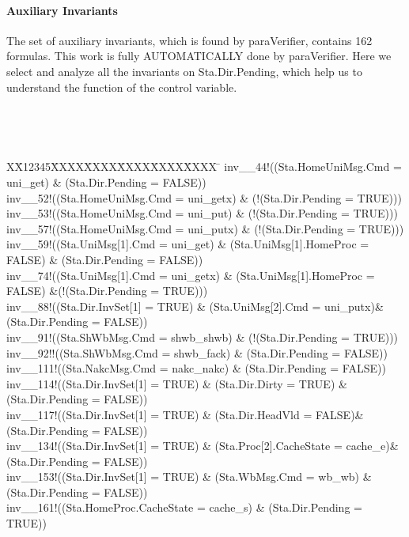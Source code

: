\documentclass{llncs}
\newlength{\fminilength}
\newenvironment{fmini}[1][\linewidth]
  {\setlength{\fminilength}{#1\fboxsep-2\fboxrule}%
   \vspace{2ex}\noindent\begin{lrbox}{\fminibox}\begin{minipage}{\fminilength}%
   \mbox{ }\hfill\vspace{-2.5ex}}%
  {\end{minipage}\end{lrbox}\vspace{1ex}\hspace{0ex}%
   \framebox{\usebox{\fminibox}}}
\newenvironment{specification}
{\noindent\scriptsize
\tt\begin{fmini}\begin{tabbing}X\=X12345\=XXXX\=XXXX\=XXXX\=XXXX\=XXXX
\=\+\kill} {\end{tabbing}\normalfont\end{fmini}}
\begin{document}
\vspace{-10pt}

\paragraph{Auxiliary Invariants }
The set of auxiliary invariants, which is found by {\sf paraVerifier}, contains 162 formulas. This work is  fully AUTOMATICALLY  done by {\sf paraVerifier}.  Here we select and analyze all the invariants on Sta.Dir.Pending, which help us to understand the function of the control variable.

\begin{specification}
inv\_\_44!((Sta.HomeUniMsg.Cmd = uni\_get) \& (Sta.Dir.Pending = FALSE))\\
inv\_\_52!((Sta.HomeUniMsg.Cmd = uni\_getx) \& (!(Sta.Dir.Pending = TRUE)))\\
inv\_\_53!((Sta.HomeUniMsg.Cmd = uni\_put) \& (!(Sta.Dir.Pending = TRUE)))\\
inv\_\_57!((Sta.HomeUniMsg.Cmd = uni\_putx) \& (!(Sta.Dir.Pending = TRUE)))\\
inv\_\_59!((Sta.UniMsg[1].Cmd = uni\_get) \& (Sta.UniMsg[1].HomeProc = FALSE) \& (Sta.Dir.Pending = FALSE))\\
inv\_\_74!((Sta.UniMsg[1].Cmd = uni\_getx) \& (Sta.UniMsg[1].HomeProc = FALSE) \&(!(Sta.Dir.Pending = TRUE)))\\
inv\_\_88!((Sta.Dir.InvSet[1] = TRUE)  \& (Sta.UniMsg[2].Cmd = uni\_putx)\& (Sta.Dir.Pending = FALSE))\\
inv\_\_91!((Sta.ShWbMsg.Cmd = shwb\_shwb) \& (!(Sta.Dir.Pending = TRUE)))\\
inv\_\_92!!((Sta.ShWbMsg.Cmd = shwb\_fack) \& (Sta.Dir.Pending = FALSE))\\
inv\_\_111!((Sta.NakcMsg.Cmd = nakc\_nakc) \& (Sta.Dir.Pending = FALSE))\\
inv\_\_114!((Sta.Dir.InvSet[1] = TRUE) \& (Sta.Dir.Dirty = TRUE) \& (Sta.Dir.Pending = FALSE))\\
inv\_\_117!((Sta.Dir.InvSet[1] = TRUE)  \& (Sta.Dir.HeadVld = FALSE)\& (Sta.Dir.Pending = FALSE))\\
inv\_\_134!((Sta.Dir.InvSet[1] = TRUE)  \& (Sta.Proc[2].CacheState = cache\_e)\& (Sta.Dir.Pending = FALSE))\\
inv\_\_153!((Sta.Dir.InvSet[1] = TRUE) \& (Sta.WbMsg.Cmd = wb\_wb) \& (Sta.Dir.Pending = FALSE))\\
inv\_\_161!((Sta.HomeProc.CacheState = cache\_s) \& (Sta.Dir.Pending = TRUE))\\
\end{specification}
\end{document}

